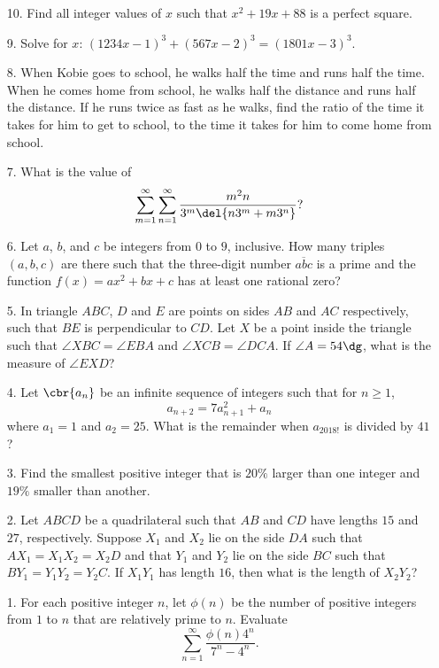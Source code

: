 \documentclass[11pt,paper=letter]{scrartcl}
\begin{document}
\begin{enumerate}
  \item[10.] Find all integer values of $x$ such that $x^2 + 19x + 88$ is a perfect square.

  \item[9.] Solve for $x$: $(1234x-1)^3+(567x-2)^3=(1801x-3)^3$.

  \item[8.] When Kobie goes to school, he walks half the time and runs half the time. When he comes home from school, he walks half the distance and runs half the distance. If he runs twice as fast as he walks, find the ratio of the time it takes for him to get to school, to the time it takes for him to come home from school.

  \item[7.] What is the value of $$\sum_{m=1}^{\infty} \sum_{n=1}^{\infty} \frac{m^2n}{3^m \del{n3^m + m3^n}}?$$

  \item[6.] Let $a$, $b$, and $c$ be integers from $0$ to $9$, inclusive. How many triples $(a, b, c)$ are there such that the three-digit number $\overline{abc}$ is a prime and the function $f(x) = ax^2 + bx + c$ has at least one rational zero?

  \item[5.] In triangle $ABC$, $D$ and $E$ are points on sides $AB$ and $AC$ respectively, such that $BE$ is perpendicular to $CD$. Let $X$ be a point inside the triangle such that $\angle XBC = \angle EBA$ and $\angle XCB = \angle DCA$. If $\angle A = 54\dg$, what is the measure of $\angle EXD$?

  \item[4.] Let $\cbr{a_n}$ be an infinite sequence of integers such that for $n \geq 1$, $$a_{n+2} = 7a_{n+1}^2 + a_n$$ where $a_1 = 1$ and $a_2 = 25$. What is the remainder when $a_{2018!}$ is divided by $41$?

  \item[3.] Find the smallest positive integer that is $20\%$ larger than one integer and $19\%$ smaller than another.

  \item[2.] Let $ABCD$ be a quadrilateral such that $AB$ and $CD$ have lengths $15$ and $27$, respectively. Suppose $X_1$ and $X_2$ lie on the side $DA$ such that $AX_1 = X_1X_2 = X_2D$ and that $Y_1$ and $Y_2$ lie on the side $BC$ such that $BY_1 = Y_1Y_2 = Y_2C$. If $X_1Y_1$ has length $16$, then what is the length of $X_2Y_2$?

  \item[1.] For each positive integer $n$, let $\phi(n)$ be the number of positive integers from $1$ to $n$ that are relatively prime to $n$. Evaluate $$\sum_{n=1}^{\infty} \frac{\phi(n)4^n}{7^n - 4^n}.$$
\end{enumerate}
\end{document}
